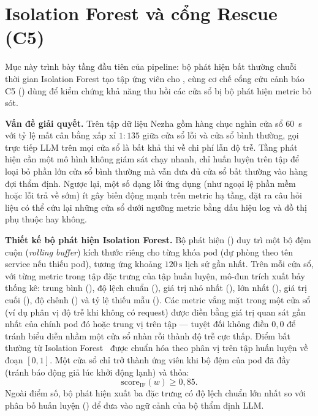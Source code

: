 \section{Isolation Forest và cổng Rescue (C5)}
\label{sec:ch4-detector}

Mục này trình bày tầng đầu tiên của pipeline: bộ phát hiện bất thường chuỗi thời gian Isolation Forest tạo tập ứng viên cho \CTAV{}, cùng cơ chế cổng cứu cảnh báo C5 () dùng để kiểm chứng khả năng thu hồi các cửa sổ bị bộ phát hiện metric bỏ sót.

\textbf{Vấn đề giải quyết.} Trên tập dữ liệu Nezha gồm hàng chục nghìn cửa sổ 60~s với tỷ lệ mất cân bằng xấp xỉ $1:135$ giữa cửa sổ lỗi và cửa sổ bình thường, gọi trực tiếp LLM trên mọi cửa sổ là bất khả thi về chi phí lẫn độ trễ. Tầng phát hiện cần một mô hình không giám sát chạy nhanh, chỉ huấn luyện trên tập  để loại bỏ phần lớn cửa sổ bình thường mà vẫn đưa đủ cửa sổ bất thường vào hàng đợi thẩm định. Ngược lại, một số dạng lỗi ứng dụng (như ngoại lệ phần mềm hoặc lỗi trả về sớm) ít gây biến động mạnh trên metric hạ tầng, đặt ra câu hỏi liệu có thể cứu lại những cửa sổ dưới ngưỡng metric bằng dấu hiệu log và đồ thị phụ thuộc hay không.

\textbf{Thiết kế bộ phát hiện Isolation Forest.} Bộ phát hiện  () duy trì một bộ đệm cuộn (\emph{rolling buffer}) kích thước  riêng cho từng khóa pod (dự phòng theo tên service nếu thiếu pod), tương ứng khoảng $120\,\text{s}$ lịch sử gần nhất. Trên mỗi cửa sổ, với từng metric trong tập đặc trưng của tập huấn luyện, mô-đun trích xuất bảy thống kê: trung bình (), độ lệch chuẩn (), giá trị nhỏ nhất (), lớn nhất (), giá trị cuối (), độ chênh () và tỷ lệ thiếu mẫu (). Các metric vắng mặt trong một cửa sổ (ví dụ phân vị độ trễ  khi không có request) được điền bằng giá trị quan sát gần nhất của chính pod đó hoặc trung vị trên tập  — tuyệt đối không điền $0{,}0$ để tránh biểu diễn nhầm một cửa sổ nhàn rỗi thành độ trễ cực thấp. Điểm bất thường từ Isolation Forest~\cite{liu2008iforest} được chuẩn hóa theo phân vị trên tập huấn luyện về đoạn $[0, 1]$. Một cửa sổ chỉ trở thành ứng viên  khi bộ đệm của pod đã đầy (tránh báo động giả lúc khởi động lạnh) và thỏa:
\begin{equation}
  \text{score}_{\text{IF}}(w) \ge 0{,}85.
  \label{eq:ch4-if-rule}
\end{equation}
Ngoài điểm số, bộ phát hiện xuất ba đặc trưng có độ lệch chuẩn lớn nhất so với phân bố huấn luyện () để đưa vào ngữ cảnh của bộ thẩm định LLM.

